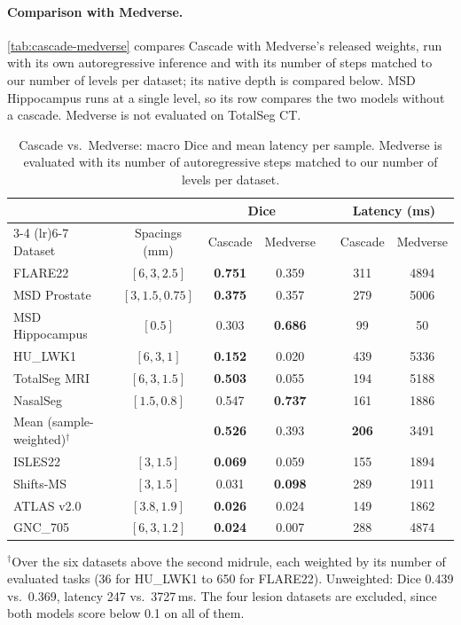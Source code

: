 \documentclass[hidelinks, a4paper, 12pt, ngerman, english]{article}  %
\begin{document}
\paragraph{Comparison with Medverse.}
\autoref{tab:cascade-medverse} compares Cascade with Medverse's released
weights, run with its own autoregressive inference and with its number of
steps matched to our number of levels per dataset; its native depth is
compared below. MSD Hippocampus runs at a single level, so its row compares
the two models without a cascade. Medverse is not evaluated on TotalSeg CT.

\begin{table}[t]
  \centering
  \small
  \caption{Cascade vs.\ Medverse: macro Dice and mean latency per sample.
  Medverse is evaluated with its number of autoregressive steps matched to our
  number of levels per dataset.}
  \label{tab:cascade-medverse}
  \begin{tabular}{@{}lcccccc@{}}
    \toprule
    & & \multicolumn{2}{c}{Dice} & & \multicolumn{2}{c}{Latency (ms)} \\
    \cmidrule(lr){3-4} \cmidrule(lr){6-7}
    Dataset & Spacings (mm) & Cascade & Medverse & & Cascade & Medverse \\
    \midrule
    FLARE22         & $[6, 3, 2.5]$    & \textbf{0.751} & 0.359 & & 311 & 4894 \\
    MSD Prostate    & $[3, 1.5, 0.75]$ & \textbf{0.375} & 0.357 & & 279 & 5006 \\
    MSD Hippocampus & $[0.5]$          & 0.303 & \textbf{0.686} & & 99  & 50   \\
    HU\_LWK1        & $[6, 3, 1]$      & \textbf{0.152} & 0.020 & & 439 & 5336 \\
    TotalSeg MRI    & $[6, 3, 1.5]$    & \textbf{0.503} & 0.055 & & 194 & 5188 \\
    NasalSeg        & $[1.5, 0.8]$     & 0.547 & \textbf{0.737} & & 161 & 1886 \\
    \midrule
    Mean (sample-weighted)$^{\dagger}$ & & \textbf{0.526} & 0.393 & & \textbf{206} & 3491 \\
    \midrule
    ISLES22         & $[3, 1.5]$       & \textbf{0.069} & 0.059 & & 155 & 1894 \\
    Shifts-MS       & $[3, 1.5]$       & 0.031 & \textbf{0.098} & & 289 & 1911 \\
    ATLAS v2.0      & $[3.8, 1.9]$     & \textbf{0.026} & 0.024 & & 149 & 1862 \\
    GNC\_705        & $[6, 3, 1.2]$    & \textbf{0.024} & 0.007 & & 288 & 4874 \\
    \bottomrule
  \end{tabular}
  \par\vspace{0.5em}
  \raggedright\footnotesize
  $^{\dagger}$Over the six datasets above the second midrule, each weighted by
  its number of evaluated tasks (36 for HU\_LWK1 to 650 for FLARE22).
  Unweighted: Dice 0.439 vs.\ 0.369, latency 247 vs.\ 3727\,ms. The four
  lesion datasets are excluded, since both models score below 0.1 on all of
  them.
\end{table}
\end{document}
